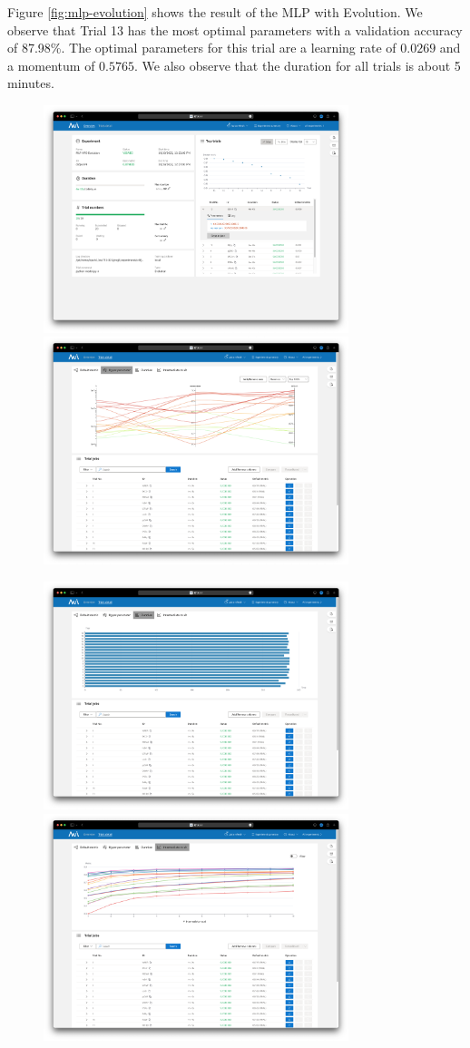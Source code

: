 \documentclass{article}
\begin{document}
Figure \ref{fig:mlp-evolution} shows the result of the MLP with Evolution. We observe that Trial 13 has the most optimal parameters with a validation accuracy of 87.98\%. The optimal parameters for this trial are a learning rate of $0.0269$ and a momentum of $0.5765$. We also observe that the duration for all trials is about 5 minutes.

\begin{figure}
    \centerline{\includegraphics[width=3.5in]{../proj3/figures/mlp_evolution_overview.png}\includegraphics[width=3.5in]{../proj3/figures/mlp_evolution_hyperparameter.png}}
    \centerline{\includegraphics[width=3.5in]{../proj3/figures/mlp_evolution_latency.png}\includegraphics[width=3.5in]{../proj3/figures/mlp_evolution_intermediate.png}}

\end{figure}
\end{document}

